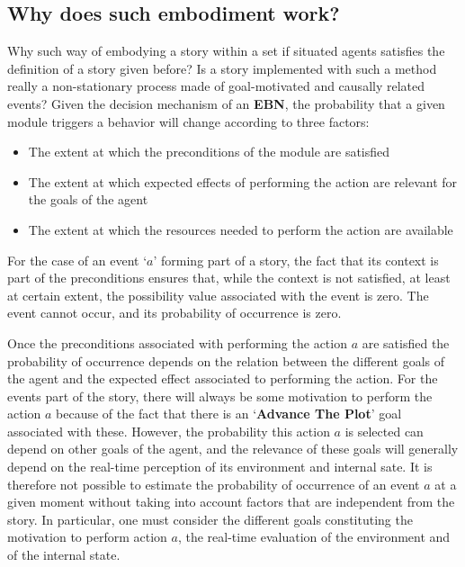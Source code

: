 \documentclass[
		twoside,openright,titlepage,numbers=noenddot,manychapters,
		headinclude,%
                footinclude=false,cleardoublepage=empty,
                BCOR=5mm,
		fontsize=11pt, %
                 enabledeprecatedfontcommands]{scrreprt}
\begin{document}
\subsection{Why does such embodiment work?}
 
Why such way of embodying a story within a set if situated agents satisfies the definition of a story given before? Is a story implemented with such a method really a non-stationary process made of goal-motivated and causally related events? Given the decision mechanism of an \textbf{EBN}, the probability that a given module triggers a behavior will change according to three factors: 
\begin{itemize}
\item The extent at which the preconditions of the module are satisfied
\item 	The extent at which expected effects of performing the action are relevant for the goals of the agent
\item 	The extent at which the resources needed to perform the action are available
\end{itemize}
For the case of an event ‘$a$’ forming part of a story, the fact that its context is part of the preconditions ensures that, while the context is not satisfied, at least at certain extent, the possibility value associated with the event is zero. The event cannot occur, and its probability of occurrence is zero. 

Once the preconditions associated with performing the action $a$ are satisfied the probability of occurrence depends on the relation between the different goals of the agent and the expected effect associated to performing the action. For the events part of the story, there will always be some motivation to perform the action $a$ because of the fact that there is an ‘\textbf{Advance The Plot}’ goal associated with these. However, the probability this action $a$ is selected can depend on other goals of the agent, and the relevance of these goals will generally depend on the real-time perception of its environment and internal sate. It is therefore not possible to estimate the probability of occurrence of an event $a$ at a given moment without taking into account factors that are independent from the story. In particular, one must consider the different goals constituting the motivation to perform action $a$, the real-time evaluation of the environment and  of the internal state.
\end{document}

